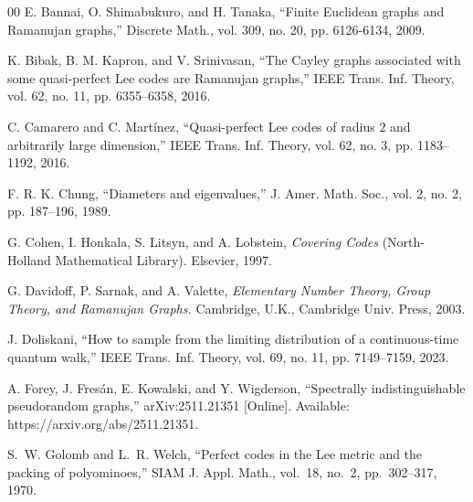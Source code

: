 \documentclass{amsart}
\numberwithin{equation}{section}
\begin{document}
\begin{thebibliography}{00}
E. Bannai, O. Shimabukuro, and H. Tanaka, 
``Finite Euclidean graphs and Ramanujan graphs,'' 
Discrete Math., vol. 309, no. 20, pp. 6126-6134, 2009.

K. Bibak, B. M. Kapron, and V. Srinivasan, 
``The Cayley graphs associated with some quasi-perfect Lee codes are Ramanujan graphs,''
IEEE Trans. Inf. Theory, vol. 62, no. 11, pp. 6355--6358, 2016.

C. Camarero and C. Mart\'{i}nez, 
``Quasi-perfect Lee codes of radius $2$ and arbitrarily large dimension,'' 
IEEE Trans. Inf. Theory, vol. 62, no. 3, pp. 1183–1192, 2016.

F. R. K. Chung, 
``Diameters and eigenvalues,'' 
J. Amer. Math. Soc., vol. 2, no. 2, pp. 187--196, 1989.

 G. Cohen, I. Honkala, S. Litsyn, and A. Lobstein,
 \emph{Covering Codes} (North-Holland Mathematical Library). Elsevier, 1997.


G. Davidoff, P. Sarnak, and A. Valette, 
\emph{Elementary Number Theory, Group Theory, and Ramanujan Graphs.} Cambridge, U.K., Cambridge Univ. Press, 2003.

J. Doliskani, 
``How to sample from the limiting distribution of a
continuous-time quantum walk,''
IEEE Trans. Inf. Theory, vol. 69, no. 11, pp. 7149--7159, 2023.

A. Forey, J. Fres\'{a}n, E. Kowalski, and Y. Wigderson, 
``Spectrally indistinguishable pseudorandom graphs,'' 
arXiv:2511.21351 [Online]. Available: https://arxiv.org/abs/2511.21351.


S.~W. Golomb and L.~R. Welch, 
``Perfect codes in the {L}ee metric and the packing of polyominoes,'' SIAM J. Appl. Math., vol.~18, no.~2, pp.~302--317, 1970.



\end{thebibliography}
\end{document}
